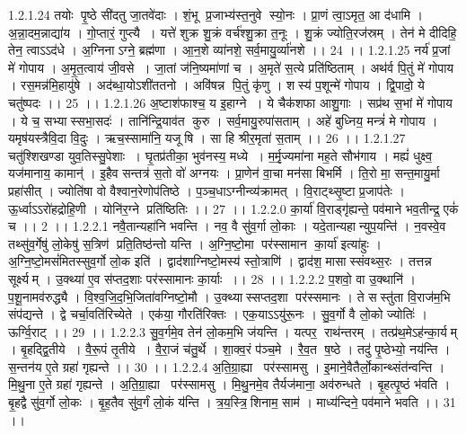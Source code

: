 1.2.1.24
तयोः पृ॒ष्ठे सी॑दतु जा॒तवे॑दाः । शं॒भू प्र॒जाभ्य॑स्त॒नुवे स्यो॒नः । प्रा॒णं त्वा॒ऽमृत॒ आ द॑धामि । अ॒न्ना॒दम॒न्नाद्या॑य । गो॒प्तारं॒ गुप्त्यै । यत्ते॑ शुक्र शु॒क्रं वर्च॑श्शु॒क्रा त॒नूः । शु॒क्रं ज्योति॒रज॑स्रम् । तेन॑ मे दीदिहि॒ तेन॒ त्वाऽऽद॑धे । अ॒ग्निनाऽग्ने॒ ब्रह्म॑णा । आ॒न॒शे व्या॑नशे॒ सर्व॒मायु॒र्व्या॑नशे ।। 24 ।।
1.2.1.25
नर्य॑ प्र॒जां मे॑ गोपाय । अ॒मृ॒त॒त्वाय॑ जी॒वसे । जा॒तां ज॑नि॒ष्यमा॑णां च । अ॒मृते॑ स॒त्ये प्रति॑ष्ठिताम् । अथ॑र्व पि॒तुं मे॑ गोपाय । रस॒मन्न॑मि॒हायु॑षे । अद॑ब्धा॒योऽशी॑ततनो । अवि॑षन्न पि॒तुं कृ॑णु । शस्य॑ प॒शून्मे॑ गोपाय । द्वि॒पादो॒ ये चतु॑ष्पदः ।। 25 ।।
1.2.1.26
अ॒ष्टाश॑फाश्च॒ य इ॒हाग्ने । ये चैक॑शफा आशु॒गाः । सप्र॑थ स॒भां मे॑ गोपाय । ये च॒ सभ्यास्सभा॒सदः॑ । तानि॑न्द्रि॒याव॑त कुरु । सर्व॒मायु॒रुपा॑सताम् । अहे॑ बुध्निय॒ मन्त्रं॑ मे गोपाय । यमृष॑यस्त्रैवि॒दा वि॒दुः । ऋच॒स्सामा॑नि॒ यजू॑षि । सा हि श्रीर॒मृता॑ स॒ताम् ।। 26 ।।
1.2.1.27
चतु॑श्शिखण्डा युव॒तिस्सु॒पेशाः । घृ॒तप्र॑तीका॒ भुव॑नस्य॒ मध्ये । म॒र्मृ॒ज्यमा॑ना मह॒ते सौभ॑गाय । मह्यं॑ धुक्ष्व॒ यज॑मानाय॒ कामान्॑ । इ॒हैव सन्तत्र॑ स॒तो वो॑ अग्नयः । प्रा॒णेन॑ वा॒चा मन॑सा बिभर्मि । ति॒रो मा॒ सन्त॒मायु॒र्मा प्रहा॑सीत् । ज्योति॑षा वो वैश्वान॒रेणोप॑तिष्ठे । प॒ञ्च॒धाऽग्नीन्व्य॑क्रामत् । वि॒राट्थ्सृ॒ष्टा प्र॒जाप॑तेः । ऊ॒र्ध्वाऽऽरो॑हद्रोहि॒णी । योनि॑र॒ग्ने प्रति॑ष्ठितिः ।। 27 ।।
1.2.2.0
का॒र्या॑ वि॒राड्गृ॑ह्यन्ते॒ पव॑माने भव॒तीन्द्र॒ एकं॑ च ।। 2 ।।
1.2.2.1
नवै॒तान्यहा॑नि भवन्ति । नव॒ वै सु॑व॒र्गा लो॒काः । यदे॒तान्यहान्युप॒यन्ति॑ । न॒वस्वे॒व तथ्सु॑व॒र्गेषु॑ लो॒केषु॑ स॒त्रिण॑ प्रति॒तिष्ठ॑न्तो यन्ति । अ॒ग्नि॒ष्टो॒मा पर॑स्सामान का॒र्या॑ इत्या॑हुः । अ॒ग्नि॒ष्टो॒मसं॑मितस्सुव॒र्गो लो॒क इति॑ । द्वाद॑शाग्निष्टो॒मस्य॑ स्तो॒त्राणि॑ । द्वाद॑श॒ मासास्संवथ्स॒रः । तत्तन्न सूर्क्ष्यम् । उ॒क्थ्या॑ ए॒व स॑प्तद॒शाः पर॑स्सामानः का॒र्याः ।। 28 ।।
1.2.2.2
प॒शवो॒ वा उ॒क्थानि॑ । प॒शू॒नामव॑रुद्ध्यै । वि॒श्व॒जि॒द॒भि॒जिता॑वग्निष्टो॒मौ । उ॒क्थ्यास्सप्तद॒शा पर॑स्समानः । ते सस्तु॑ता वि॒राज॑म॒भि संप॑द्यन्ते । द्वे चर्चा॒वति॑रिच्येते । एक॑या॒ गौरति॑रिक्तः । एक॒याऽऽयु॑रू॒नः । सु॒व॒र्गो वै लो॒को ज्योतिः॑ । ऊर्ग्वि॒राट् ।। 29 ।।
1.2.2.3
सु॒व॒र्गमे॒व तेन॑ लो॒कम॒भि ज॑यन्ति । यत्पर॒॒ राथ॑न्तरम् । तत्प्र॑थ॒मेऽह॑न्का॒र्यम् । बृ॒हद्द्वि॒तीये । वै॒रू॒पं तृ॒तीये । वै॒रा॒जं च॑तु॒र्थे । शा॒क्व॒रं प॑ञ्च॒मे । रै॒व॒त ष॒ष्ठे । तदु॑ पृ॒ष्ठेभ्यो॒ नय॑न्ति । स॒न्तन॑य ए॒ते ग्रहा॑ गृह्यन्ते ।। 30 ।।
1.2.2.4
अ॒ति॒ग्रा॒ह्या पर॑स्सामसु । इ॒माने॒वैतैर्लो॒कान्थ्संत॑न्वन्ति । मि॒थु॒ना ए॒ते ग्रहा॑ गृह्यन्ते । अ॒ति॒ग्रा॒ह्या पर॑स्सामसु । मि॒थु॒नमे॒व तैर्यज॑माना॒ अव॑रुन्धते । बृ॒हत्पृ॒ष्ठं भ॑वति । बृ॒हद्वै सु॑व॒र्गो लो॒कः । बृ॒ह॒तैव सु॑व॒र्गं लो॒कं य॑न्ति । त्र॒य॒स्त्रि॒॒शिनाम॒ साम॑ । माध्य॑न्दिने॒ पव॑माने भवति ।। 31 ।।
